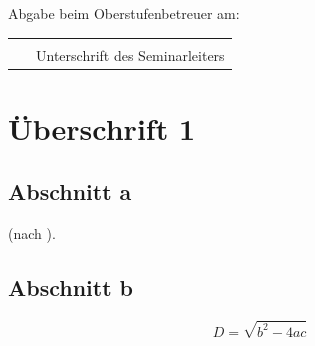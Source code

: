 \documentclass[a4paper,12pt,oneside]{scrartcl}  %
\begin{document}
\begin{titlepage}
{  \vspace{0.5cm}

  Abgabe beim Oberstufenbetreuer am:~~\framebox[5.6cm][l]{\raisebox{0pt}[1.2cm][0.3cm]{~}}
  
  \vspace{\fill}

  \begin{tabular}{cc} 
   \hspace{5cm} & \hspace{8.5cm} \\\cline{2-2} 
   ~ & Unterschrift des Seminarleiters 
  \end{tabular}
  }

 \end{titlepage}


 \begingroup
 \pagestyle{empty} %
 \tableofcontents %
 \clearpage %
 \endgroup

 \newpage


 \setcounter{page}{1} %
	
 \section{Überschrift 1}\label{s1}
	
 \subsection{Abschnitt a}\label{s1ss1}
 
 \blindtext
 (nach \cite{Moore:1965}).
	
 \clearpage
	
 \subsection{Abschnitt b}\label{s1ss2}

 \blindtext
 \citep{FliessbachEDyn,DAMaike}
 \blindtext
 \citep{DissFWilhelm}

 \begin{equation}\label{eq1}
  D = \sqrt{b^2-4ac} 
 \end{equation}
 
\end{document}
